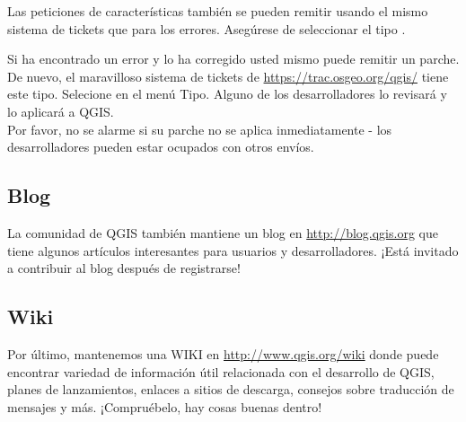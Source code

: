 Las peticiones de características también se pueden remitir usando el mismo sistema de tickets que para los 
errores. Asegúrese de seleccionar el tipo .

Si ha encontrado un error y lo ha corregido usted mismo puede remitir un parche. De nuevo, el maravilloso 
sistema de tickets de \url{https://trac.osgeo.org/qgis/} tiene este tipo. Selecione  en 
el menú Tipo. Alguno de los desarrolladores lo revisará y lo aplicará a QGIS. \\
Por favor, no se 
alarme si su parche no se aplica inmediatamente - los desarrolladores pueden estar ocupados con otros envíos.


\subsection{Blog}
La comunidad de QGIS también mantiene un blog en \url{http://blog.qgis.org} 
que tiene algunos artículos interesantes para usuarios y desarrolladores. ¡Está invitado a contribuir al blog después de registrarse!

\subsection{Wiki}
Por último, mantenemos una WIKI en \url{http://www.qgis.org/wiki} donde puede encontrar variedad de información útil relacionada con el desarrollo de QGIS, planes de lanzamientos, enlaces a sitios de descarga, consejos sobre traducción de mensajes y más. 
¡Compruébelo, hay cosas buenas dentro!

